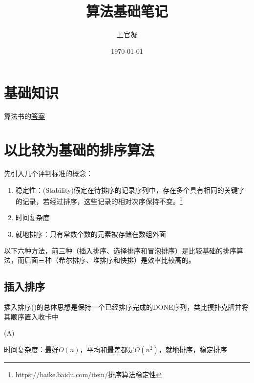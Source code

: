 \documentclass[]{report}
\title{{\huge {算法基础笔记}}}
\author{上官凝}
\date{\today}
\begin{document}
\theoremstyle{definition} \newtheorem{theorem}{Thm}[section] %
\theoremstyle{definition} \newtheorem{definition}{Def}[section] %
\theoremstyle{plain} \newtheorem{lemma}{lemma}[section] %

	\maketitle
	\newpage

	\tableofcontents
	\newpage

	\chapter{基础知识}
	算法书的\href{https://ita.skanev.com/08/03/02.html}{答案}
	\chapter{以比较为基础的排序算法}
	先引入几个评判标准的概念：
	\begin{enumerate}
		\item 稳定性：(Stability)假定在待排序的记录序列中，存在多个具有相同的关键字的记录，若经过排序，这些记录的相对次序保持不变。\footnote{https://baike.baidu.com/item/排序算法稳定性}
		\item 时间复杂度
		\item 就地排序：只有常数个数的元素被存储在数组外面
	\end{enumerate}
	以下六种方法，前三种（插入排序、选择排序和冒泡排序）是比较基础的排序算法，而后面三种（希尔排序、堆排序和快排）是效率比较高的。
	\section{插入排序}
		插入排序({})的总体思想是保持一个已经排序完成的DONE序列，类比摸扑克牌并将其顺序置入收卡中
		\begin{algorithm}
			\caption{{}(A)}
		\end{algorithm}
		时间复杂度：最好$O(n)$，平均和最差都是$O(n^2)$，就地排序，稳定排序
\end{document}
